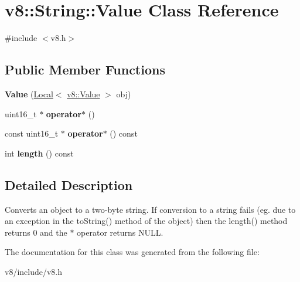 \hypertarget{classv8_1_1String_1_1Value}{}\section{v8\+:\+:String\+:\+:Value Class Reference}
\label{classv8_1_1String_1_1Value}


{\ttfamily \#include $<$v8.\+h$>$}

\subsection*{Public Member Functions}
\begin{DoxyCompactItemize}
\item 
{\bfseries Value} (\hyperlink{classv8_1_1Local}{Local}$<$ \hyperlink{classv8_1_1Value}{v8\+::\+Value} $>$ obj)\hypertarget{classv8_1_1String_1_1Value_a5b968a237946fb3313527797f04a7e0f}{}\label{classv8_1_1String_1_1Value_a5b968a237946fb3313527797f04a7e0f}

\item 
uint16\+\_\+t $\ast$ {\bfseries operator$\ast$} ()\hypertarget{classv8_1_1String_1_1Value_ae4f44b1977968de2e9f2ff703437fde3}{}\label{classv8_1_1String_1_1Value_ae4f44b1977968de2e9f2ff703437fde3}

\item 
const uint16\+\_\+t $\ast$ {\bfseries operator$\ast$} () const \hypertarget{classv8_1_1String_1_1Value_a1cf21001f92284f290a6e550d567e757}{}\label{classv8_1_1String_1_1Value_a1cf21001f92284f290a6e550d567e757}

\item 
int {\bfseries length} () const \hypertarget{classv8_1_1String_1_1Value_a4b5014d7d4d0f60d39f37e421ae2eb91}{}\label{classv8_1_1String_1_1Value_a4b5014d7d4d0f60d39f37e421ae2eb91}

\end{DoxyCompactItemize}


\subsection{Detailed Description}
Converts an object to a two-\/byte string. If conversion to a string fails (eg. due to an exception in the to\+String() method of the object) then the length() method returns 0 and the $\ast$ operator returns N\+U\+LL. 

The documentation for this class was generated from the following file\+:\begin{DoxyCompactItemize}
\item 
v8/include/v8.\+h\end{DoxyCompactItemize}
